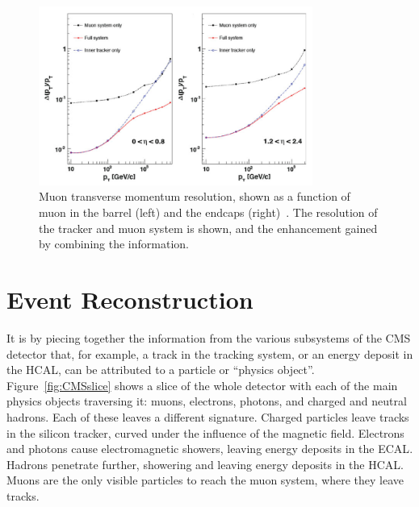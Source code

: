 \begin{figure}[htbp]
  \begin{center}
  \includegraphics[width=0.8\textwidth]{Figures/detector/CMSmuonRes}
  \caption{Muon transverse momentum resolution, shown as a function of muon \pt in the barrel (left) and the endcaps (right)~\cite{Chatrchyan:2008zzk}. The resolution of the tracker and muon system is shown, and the enhancement gained by combining the information. 
}
  \label{fig:CMSmuonRes}
  \end{center}
\end{figure}

%                                                                  

\newpage
\section{Event Reconstruction} \label{sec:CMSreco}

It is by piecing together the information from the various subsystems of the \ac{CMS} detector that, for example, a track in the tracking system, or an energy deposit in the \ac{HCAL}, can be attributed to a particle or ``physics object''. 
Figure~\ref{fig:CMSslice} shows a slice of the whole detector with each of the main physics objects traversing it: muons, electrons, photons, and charged and neutral hadrons.
Each of these leaves a different signature.
Charged particles leave tracks in the silicon tracker, curved under the influence of the magnetic field.
Electrons and photons cause electromagnetic showers, leaving energy deposits in the \ac{ECAL}.
Hadrons penetrate further, showering and leaving energy deposits in the \ac{HCAL}. 
Muons are the only visible particles to reach the muon system, where they leave tracks.

